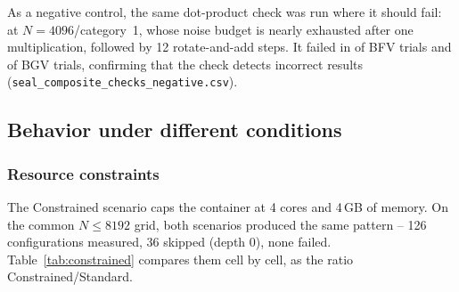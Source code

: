 As a negative control, the same dot-product check was run where it should fail: at $N{=}4096$/category~1, whose noise budget is nearly exhausted after one multiplication, followed by 12 rotate-and-add steps. It failed in \negFailBFV{} of \negTrials{} BFV trials and \negFailBGV{} of \negTrials{} BGV trials, confirming that the check detects incorrect results (\texttt{seal\_composite\_checks\_negative.csv}).

\begin{table}[h!]
\centering\small

\caption{Decrypt-and-compare checks of the composite workloads, $N{=}8192$/category~1, 10 trials per cell and input set; dot product at lengths 8, 64, 512 and the full slot count (from \texttt{seal\_composite\_checks.csv}).}
\label{tab:composite-checks}
\end{table}

\clearpage
\subsection{Behavior under different conditions}

\subsubsection*{Resource constraints}

The Constrained scenario caps the container at 4 cores and 4\,GB of memory. On the common $N \le 8192$ grid, both scenarios produced the same pattern -- 126 configurations measured, 36 skipped (depth 0), none failed. Table~\ref{tab:constrained} compares them cell by cell, as the ratio Constrained/Standard.

\begin{table}[h!]
\centering\small

\caption{Constrained vs.\ Standard on the 126 common cells ($N \le 8192$). Latency comes from the main timing runs; energy and memory from the dedicated energy/memory runs, with the same protocol in both scenarios.}
\label{tab:constrained}
\end{table}

